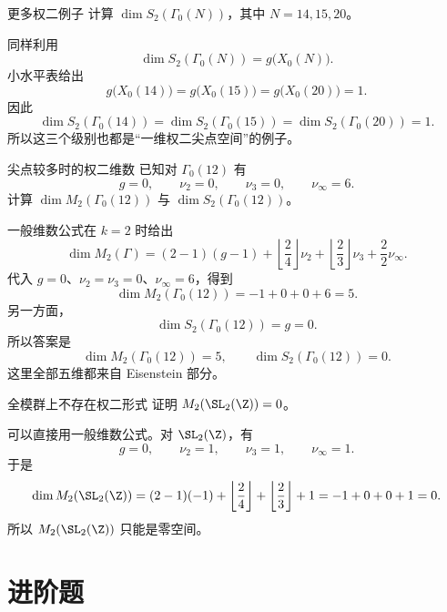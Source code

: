 \begin{problem}{更多权二例子}
\easy
计算 $\dim S_2(\Gamma_0(N))$，其中 $N=14,15,20$。
\end{problem}
\begin{solution}
同样利用
\[
\dim S_2(\Gamma_0(N))=g\bigl(X_0(N)\bigr).
\]
小水平表给出
\[
g\bigl(X_0(14)\bigr)=g\bigl(X_0(15)\bigr)=g\bigl(X_0(20)\bigr)=1.
\]
因此
\[
\dim S_2(\Gamma_0(14))=
\dim S_2(\Gamma_0(15))=
\dim S_2(\Gamma_0(20))=1.
\]
所以这三个级别也都是“一维权二尖点空间”的例子。
\end{solution}

\begin{problem}{尖点较多时的权二维数}
\easy
已知对 $\Gamma_0(12)$ 有
\[
g=0,\qquad \nu_2=0,\qquad \nu_3=0,\qquad \nu_\infty=6.
\]
计算 $\dim M_2(\Gamma_0(12))$ 与 $\dim S_2(\Gamma_0(12))$。
\end{problem}
\begin{solution}
一般维数公式在 $k=2$ 时给出
\[
\dim M_2(\Gamma)= (2-1)(g-1)+\left\lfloor\frac{2}{4}\right\rfloor\nu_2+
\left\lfloor\frac{2}{3}\right\rfloor\nu_3+\frac{2}{2}\nu_\infty.
\]
代入 $g=0$、$\nu_2=\nu_3=0$、$\nu_\infty=6$，得到
\[
\dim M_2(\Gamma_0(12))=-1+0+0+6=5.
\]
另一方面，
\[
\dim S_2(\Gamma_0(12))=g=0.
\]
所以答案是
\[
\dim M_2(\Gamma_0(12))=5,
\qquad
\dim S_2(\Gamma_0(12))=0.
\]
这里全部五维都来自 Eisenstein 部分。
\end{solution}

\begin{problem}{全模群上不存在权二形式}
\easy
证明 $M_2(\SL_2(\Z))=0$。
\end{problem}
\begin{solution}
可以直接用一般维数公式。对 $\SL_2(\Z)$，有
\[
g=0,\qquad \nu_2=1,\qquad \nu_3=1,\qquad \nu_\infty=1.
\]
于是
\[
\dim M_2(\SL_2(\Z))=(2-1)(-1)+\left\lfloor\frac{2}{4}\right\rfloor+
\left\lfloor\frac{2}{3}\right\rfloor+1=-1+0+0+1=0.
\]
所以 $M_2(\SL_2(\Z))$ 只能是零空间。
\end{solution}

\section{进阶题 \medium}

